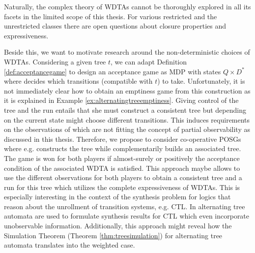 Naturally, the complex theory of \acp{WDTA} cannot be thoroughly explored in
all its facets in the limited scope of this thesis. For various restricted and
the unrestricted classes there are open questions about closure properties and
expressiveness.

Beside this, we want to motivate research around the non-deterministic choices
of \acp{WDTA}. Considering a given tree $t$, we can adapt Definition
\ref{def:acceptancegame} to design an acceptance game as \ac{MDP} with states
$Q\times D^{*}$ where \eve{} decides which transitions (compatible with $t$) to 
take. Unfortunately, it is not immediately clear how to obtain an emptiness
game from this construction as it is explained in Example
\ref{ex:alternatingtreeemptiness}.  Giving \eve{} control of the tree and the
run entails that she must construct a consistent tree but depending on the
current state might choose different transitions. This induces requirements on
the observations of \eve{} which are not fitting the concept of partial
observability as discussed in this thesis.  Therefore, we propose to consider
co-operative \acp{POSG} where e.g. \eve{} constructs the tree while \adam{}
complementarily builds an associated tree.  The game is won for both players if
almost-surely or positively the acceptance condition of the associated
\ac{WDTA} is satisfied. This approach maybe allows to use the different
observations for both players to obtain a consistent tree and a run for this
tree which utilizes the complete expressiveness of \acp{WDTA}. This is
especially interesting in the context of the synthesis problem for logics that
reason about the unrollment of transition systems, e.g. \textsc{CTL}. In
\cite{ChurchsProblemRevisited} alternating tree automata are used to formulate
synthesis results for \textsc{CTL} which even incorporate unobservable
information. Additionally, this approach might reveal how the Simulation
Theorem (Theorem \ref{thm:treesimulation}) for alternating tree automata
translates into the weighted case.


